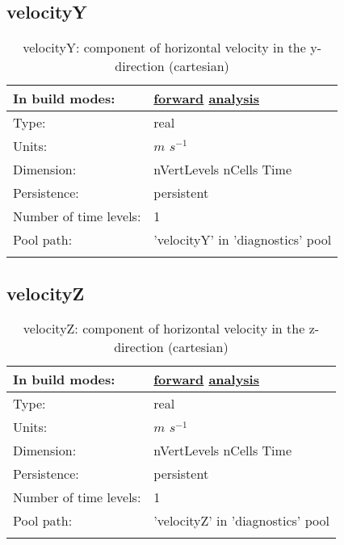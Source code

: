 \subsection[velocityY]{velocityY}
\label{subsec:var_sec_diagnostics_velocityY}
\begin{center}
\begin{longtable}{| p{2.0in} | p{4.0in} |}
        \hline 
        In build modes: & \hyperref[subsec:forward_var_tab_diagnostics]{forward} \hyperref[subsec:analysis_var_tab_diagnostics]{analysis} \\
        \hline 
        Type: & real \\
        \hline 
        Units: & $m$ $s^{-1}$ \\
        \hline 
        Dimension: & nVertLevels nCells Time \\
        \hline 
        Persistence: & persistent \\
        \hline 
        Number of time levels: & 1 \\
        \hline 
            Pool path: & 'velocityY' in 'diagnostics' pool
 \\
		 \hline 
    \caption{velocityY: component of horizontal velocity in the y-direction (cartesian)}
\end{longtable}
\end{center}
\subsection[velocityZ]{velocityZ}
\label{subsec:var_sec_diagnostics_velocityZ}
\begin{center}
\begin{longtable}{| p{2.0in} | p{4.0in} |}
        \hline 
        In build modes: & \hyperref[subsec:forward_var_tab_diagnostics]{forward} \hyperref[subsec:analysis_var_tab_diagnostics]{analysis} \\
        \hline 
        Type: & real \\
        \hline 
        Units: & $m$ $s^{-1}$ \\
        \hline 
        Dimension: & nVertLevels nCells Time \\
        \hline 
        Persistence: & persistent \\
        \hline 
        Number of time levels: & 1 \\
        \hline 
            Pool path: & 'velocityZ' in 'diagnostics' pool
 \\
		 \hline 
    \caption{velocityZ: component of horizontal velocity in the z-direction (cartesian)}
\end{longtable}
\end{center}
